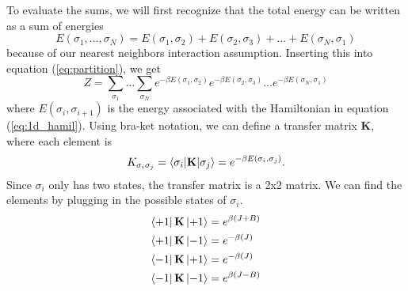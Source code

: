 \documentclass{article}
\newcommand{\be}{\begin{equation}}
\newcommand{\ee}{\end{equation}}
\newcommand{\tk}{\textbf{K}}
\begin{document}
To evaluate the sums, we will first recognize that the total energy can be written as a sum of energies
\be
  E(\sigma_1, \dots, \sigma_N) = E(\sigma_1, \sigma_2) + E(\sigma_2, \sigma_3) + \dots + E(\sigma_N, \sigma_1)
\ee
because of our nearest neighbors interaction assumption.
Inserting this into equation (\ref{eq:partition}), we get
\be
  Z = \sum_{\sigma_1} \dots \sum_{\sigma_N} e^{-\beta E(\sigma_1, \sigma_2)} e^{-\beta E(\sigma_2, \sigma_3)} \dots e^{- \beta E(\sigma_N, \sigma_1)}
\ee
where $E(\sigma_i, \sigma_{i+1})$ is the energy associated with the Hamiltonian in equation (\ref{eq:1d_hamil}).
Using bra-ket notation, we can define a transfer matrix \textbf{K}, where each element is
\be
  K_{\sigma_i \sigma_j} = \braket{\sigma_i | \tk | \sigma_j} = e^{- \beta E(\sigma_i, \sigma_j)} .
\ee
Since $\sigma_i$ only has two states, the transfer matrix is a 2x2 matrix.
We can find the elements by plugging in the possible states of $\sigma_i$.
\be
  \begin{split}
    \bra{+1} \tk \ket{+1} &= e^{\beta(J + B)} \\
    \bra{+1} \tk \ket{-1} &= e^{- \beta(J)} \\
    \bra{-1} \tk \ket{+1} &= e^{- \beta(J)} \\
    \bra{-1} \tk \ket{-1} &= e^{\beta(J - B)} \\
  \end{split}
\ee
\end{document}
